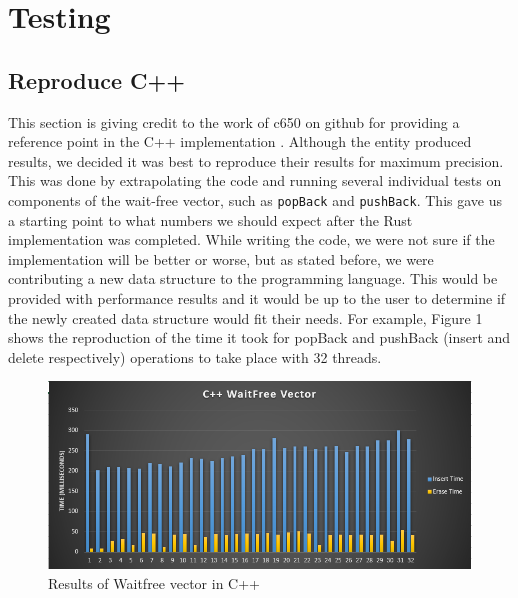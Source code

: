 \documentclass[conference]{IEEEtran}
\begin{document}
\section{Testing}



\subsection{Reproduce C++}

This section is giving credit to the work of c650 on github for providing a reference point in the C++ implementation \cite{cpp}. Although the entity produced results, we decided it was best to reproduce their results for maximum precision. This was done by extrapolating the code and running several individual tests on components of the wait-free vector, such as \verb|popBack| and \verb|pushBack|. This gave us a starting point to what numbers we should expect after the Rust implementation was completed. While writing the code, we were not sure if the implementation will be better or worse, but as stated before, we were contributing a new data structure to the programming language. This would be provided with performance results and it would be up to the user to determine if the newly created data structure would fit their needs. For example, Figure 1 shows the reproduction of the time it took for popBack and pushBack (insert and delete respectively) operations to take place with 32 threads. 
    
\begin{figure}[h]
\includegraphics[width=\linewidth]{waitfree_rand_cpp.PNG}
\caption{Results of Waitfree vector in C++}
\end{figure}

\end{document}
